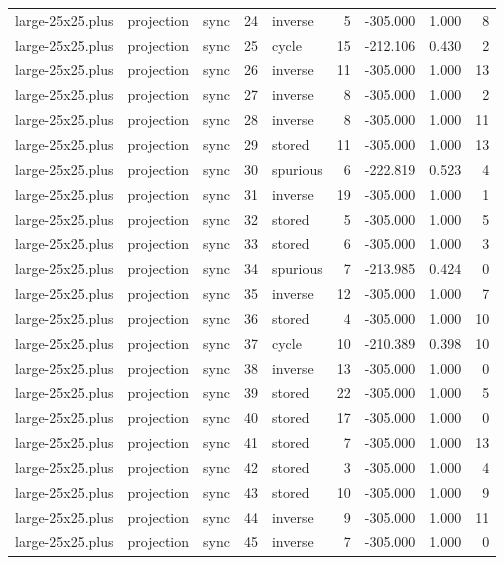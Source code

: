 \begin{tabular}{lllrlrrrr}
large-25x25.plus & projection & sync & 24 & inverse & 5 & -305.000 & 1.000 & 8 \\
large-25x25.plus & projection & sync & 25 & cycle & 15 & -212.106 & 0.430 & 2 \\
large-25x25.plus & projection & sync & 26 & inverse & 11 & -305.000 & 1.000 & 13 \\
large-25x25.plus & projection & sync & 27 & inverse & 8 & -305.000 & 1.000 & 2 \\
large-25x25.plus & projection & sync & 28 & inverse & 8 & -305.000 & 1.000 & 11 \\
large-25x25.plus & projection & sync & 29 & stored & 11 & -305.000 & 1.000 & 13 \\
large-25x25.plus & projection & sync & 30 & spurious & 6 & -222.819 & 0.523 & 4 \\
large-25x25.plus & projection & sync & 31 & inverse & 19 & -305.000 & 1.000 & 1 \\
large-25x25.plus & projection & sync & 32 & stored & 5 & -305.000 & 1.000 & 5 \\
large-25x25.plus & projection & sync & 33 & stored & 6 & -305.000 & 1.000 & 3 \\
large-25x25.plus & projection & sync & 34 & spurious & 7 & -213.985 & 0.424 & 0 \\
large-25x25.plus & projection & sync & 35 & inverse & 12 & -305.000 & 1.000 & 7 \\
large-25x25.plus & projection & sync & 36 & stored & 4 & -305.000 & 1.000 & 10 \\
large-25x25.plus & projection & sync & 37 & cycle & 10 & -210.389 & 0.398 & 10 \\
large-25x25.plus & projection & sync & 38 & inverse & 13 & -305.000 & 1.000 & 0 \\
large-25x25.plus & projection & sync & 39 & stored & 22 & -305.000 & 1.000 & 5 \\
large-25x25.plus & projection & sync & 40 & stored & 17 & -305.000 & 1.000 & 0 \\
large-25x25.plus & projection & sync & 41 & stored & 7 & -305.000 & 1.000 & 13 \\
large-25x25.plus & projection & sync & 42 & stored & 3 & -305.000 & 1.000 & 4 \\
large-25x25.plus & projection & sync & 43 & stored & 10 & -305.000 & 1.000 & 9 \\
large-25x25.plus & projection & sync & 44 & inverse & 9 & -305.000 & 1.000 & 11 \\
large-25x25.plus & projection & sync & 45 & inverse & 7 & -305.000 & 1.000 & 0 \\

\end{tabular}
